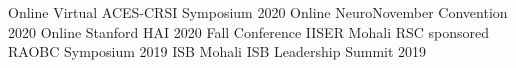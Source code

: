 {%
Online}
{%
    Virtual ACES-CRSI Symposium 2020
    }
{%
}
\vspace{-4mm}
{%
Online}
{%
    NeuroNovember Convention 2020
    }
{%
}
\vspace{-4mm}
{%
Online}
{%
    Stanford HAI 2020 Fall Conference
    }
{%
}    
\vspace{-4mm}    
{%
IISER Mohali}
{%
    RSC sponsored RAOBC Symposium 2019
    }
{%
}
\vspace{-4mm}
{%
ISB Mohali}
{%
    ISB Leadership Summit 2019
    }
{%
}